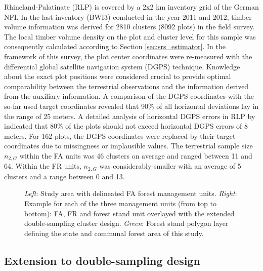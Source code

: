 \documentclass[remotesensing,article,submit,moreauthors,pdftex,10pt,a4paper]{mdpi}
\begin{document}
Rhineland-Palatinate (RLP) is covered by a 2x2 km inventory grid of the German NFI. In the last inventory (BWI3) conducted in the year 2011 and 2012, timber volume information was derived for 2810 clusters (8092 plots) in the field survey. The local timber volume density on the plot and cluster level for this sample was consequently calculated according to Section \ref{sec:srs_estimator}. In the framework of this survey, the plot center coordinates were re-measured with the differential global satellite navigation system (DGPS) technique. Knowledge about the exact plot positions were considered crucial to provide optimal comparability between the terrestrial observations and the information derived from the auxiliary information. A comparison of the DGPS coordinates with the so-far used target coordinates revealed that 90\% of all horizontal deviations lay in the range of 25 meters. A detailed analysis of horizontal DGPS errors in RLP by \citet{lambrecht2017} indicated that 80\% of the plots should not exceed horizontal DGPS errors of 8 meters. For 162 plots, the DGPS coordinates were replaced by their target coordinates due to missingness or implausible values. The terrestrial sample size $n_{2,G}$ within the FA units was 46 clusters on average and ranged between 11 and 64. Within the FR units, $n_{2,G}$ was considerably smaller with an average of 5 clusters and a range between 0 and 13.

\begin{figure}[H]
	\centering
	\caption{\textit{Left}: Study area with delineated FA forest management units. \textit{Right}: Example for each of the three management units (from top to bottom): FA, FR and forest stand unit overlayed with the extended double-sampling cluster design. \textit{Green}: Forest stand polygon layer defining the state and communal forest area of this study.}
	\label{fig:StudyArean}
\end{figure}

\subsection{Extension to double-sampling design}
\label{ext_to_2phase}
\end{document}
